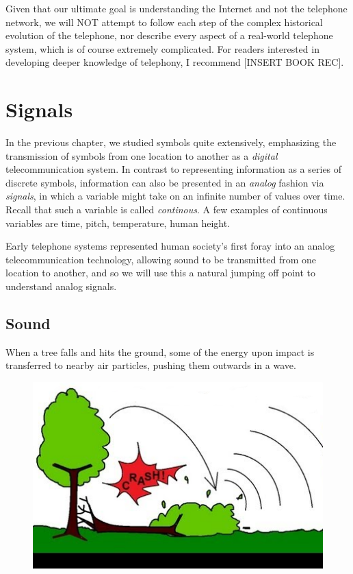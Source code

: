 \documentclass[UTF8]{book}
\begin{document}
\begin{CJK}{UTF8}{gbsn}
Given that our ultimate goal is understanding the Internet and not the telephone network, we will NOT attempt to follow each step of the complex historical evolution of the telephone, nor describe every aspect of a real-world telephone system, which is of course extremely complicated. For readers interested in developing deeper knowledge of telephony, I recommend [INSERT BOOK REC].

\chapter{Signals}

In the previous chapter, we studied symbols quite extensively, emphasizing the transmission of symbols from one location to another as a \emph{digital} telecommunication system. In contrast to representing information as a series of discrete symbols, information can also be presented in an \emph{analog} fashion via \emph{signals}, in which a variable might take on an infinite number of values over time. Recall that such a variable is called \emph{continous}. A few examples of continuous variables are time, pitch, temperature, human height.

Early telephone systems represented human society's first foray into an analog telecommunication technology, allowing sound to be transmitted from one location to another, and so we will use this a natural jumping off point to understand analog signals.

\section{Sound}

When a tree falls and hits the ground, some of the energy upon impact is transferred to nearby air particles, pushing them outwards in a wave.

\begin{figure}[H]
\centering
\includegraphics[width=0.8\linewidth]{treefalling_edited}
\end{figure}


\end{CJK}
\end{document}
